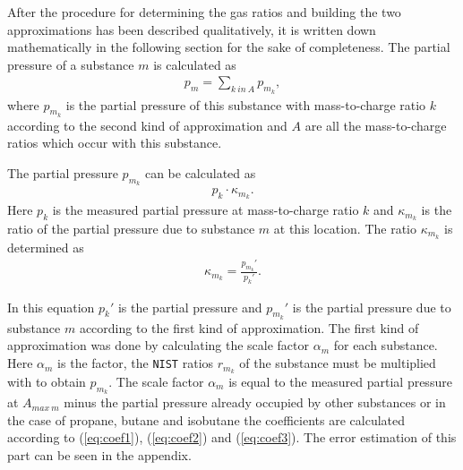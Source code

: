 After the procedure for determining the gas ratios and building the two approximations has been described qualitatively, it is written down mathematically in the following section for the sake of completeness. 
The partial pressure of a substance $m$ is calculated as
\begin{align}
   p_m = \sum_{k~in~A} {p_{m_k}}, 
\end{align}
where $p_{m_k}$ is the partial pressure of this substance with mass-to-charge ratio $k$ according to the second kind of approximation and $A$ are all the mass-to-charge ratios which occur with this substance. 


The partial pressure $p_{m_k}$ can be calculated as 
\begin{align}
    p_k\cdot \kappa_{m_k}.
\end{align}
 Here $p_k$ is the measured partial pressure at mass-to-charge ratio $k$ and $\kappa_{m_k}$ is the ratio of the partial pressure due to substance $m$ at this location. The ratio $\kappa_{m_k}$ is determined as 
 \begin{align}
     \kappa_{m_k} = \frac{p_{m_k}'}{p_{k}'}.
 \end{align}
 
In this equation $p_{k}'$ is the partial pressure and $p_{m_k}'$ is the partial pressure due to substance $m$ according to the first kind of approximation. The first kind of approximation was done by calculating the scale factor $\alpha_m$ for each substance. Here $\alpha_m$ is the factor, the \texttt{NIST} ratios $r_{m_k}$ of the substance must be multiplied with to obtain $p_{m_k}$. The scale factor $\alpha_m$ is equal to the measured partial pressure at $A_{{max}~m}$ minus the partial pressure already occupied by other substances or in the case of propane, butane and isobutane the coefficients are calculated according to (\ref{eq:coef1}), (\ref{eq:coef2}) and (\ref{eq:coef3}). The error estimation of this part can be seen in the appendix. 






